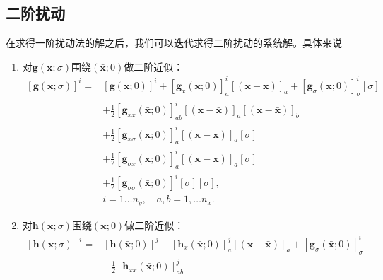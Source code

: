 \subsection{二阶扰动}
在求得一阶扰动法的解之后，我们可以迭代求得二阶扰动的系统解。具体来说
\begin{enumerate}
  \item 对$\bm{g}(\bm{x};\sigma)$围绕$(\bar{\bm{x}};0)$做二阶近似：
  \begin{equation}
    \label{eq:pta-2nd-perturbation-g}
    \begin{split}
      \left[ \bm{g}(\bm{x};\sigma) \right]^{i} =&
      \left[ \bm{g}(\bar{\bm{x}};0) \right]^{i}
      + \left[\bm{g}_x(\bar{\bm{x}};0) \right]^{i}_{a}
      \left[ \left( \bm{x} - \bar{\bm{x}}  \right) \right]_{a}
      + \left[ \bm{g}_{\sigma} (\bar{\bm{x}};0) \right]^{i}_{\sigma}
      \left[ \sigma \right] \\
      &+ \frac{1}{2}
      \left[ \bm{g}_{xx} (\bar{\bm{x}};0) \right]^{i}_{ab}
      \left[ \left( \bm{x} - \bar{\bm{x}} \right) \right]_{a}
      \left[ \left( \bm{x} - \bar{\bm{x}} \right) \right]_{b} \\
      &+\frac{1}{2}
      \left[ \bm{g}_{x \sigma} (\bar{\bm{x}};0) \right]^{i}_{a}
      \left[ \left( \bm{x} - \bar{\bm{x}} \right) \right]_{a}
      \left[ \sigma \right] \\
      &+ \frac{1}{2}
      \left[ \bm{g}_{\sigma x } (\bar{\bm{x}};0) \right]^{i}_{a}
      \left[ \left( \bm{x} - \bar{\bm{x}} \right) \right]_{a}
      \left[ \sigma \right] \\
      &+ \frac{1}{2}
      \left[ \bm{g}_{\sigma \sigma} (\bar{\bm{x}};0) \right]^{i}
      \left[ \sigma \right]
      \left[ \sigma \right],\\
      &i=1\ldots n_y, \quad a,b=1,\ldots n_x.
    \end{split}
  \end{equation}
  \item 对$\bm{h}(\bm{x};\sigma)$围绕$(\bar{\bm{x}};0)$做二阶近似：
  \begin{equation}
    \label{eq:pta-2nd-perturbation-h}
    \begin{split}
      \left[ \bm{h}(\bm{x};\sigma) \right]^{i} =&
      \left[ \bm{h}(\bar{\bm{x}};0) \right]^{j}
      + \left[\bm{h}_x(\bar{\bm{x}};0) \right]^{j}_{a}
      \left[ \left( \bm{x} - \bar{\bm{x}}  \right) \right]_{a}
      + \left[ \bm{g}_{\sigma} (\bar{\bm{x}};0) \right]^{i}_{\sigma} \\
      &+ \frac{1}{2}
      \left[ \bm{h}_{xx} (\bar{\bm{x}};0) \right]^{j}_{ab}

\end{split}
\end{equation}
\end{enumerate}
